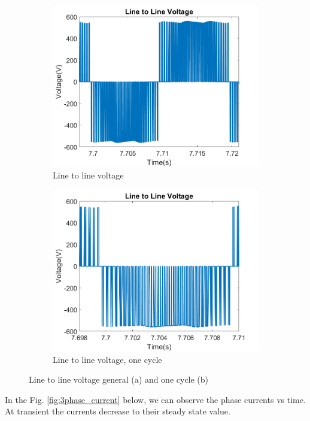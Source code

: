 \begin{figure}[H]
        \centering
        \begin{subfigure}[b]{0.475\textwidth}
            \centering
            \includegraphics[width = 8 cm]{figs/ltol.png}
            \caption{Line to line voltage}
            \label{fig:3line_V}
        \end{subfigure}
        \hfill
        \begin{subfigure}[b]{0.475\textwidth}  
            \centering 
            \includegraphics[width = 8 cm]{figs/partb-1-linetoline.png}
            \caption{Line to line voltage, one cycle}
            \label{fig:3line_1V}
        \end{subfigure}
        \caption{Line to line voltage general (a) and one cycle (b)}
        \label{fig:3phase}
        \end{figure}
        
In the Fig. \ref{fig:3phase_current} below, we can observe the phase currents vs time. At transient the currents decrease to their steady state value.

